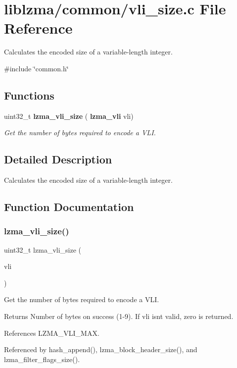 \section{liblzma/common/vli\+\_\+size.c File Reference}
\label{vli__size_8c}


Calculates the encoded size of a variable-\/length integer.  


{\ttfamily \#include \char`\"{}common.\+h\char`\"{}}\newline
\subsection*{Functions}
\begin{DoxyCompactItemize}
\item 
uint32\+\_\+t \textbf{ lzma\+\_\+vli\+\_\+size} (\textbf{ lzma\+\_\+vli} vli)
\begin{DoxyCompactList}\small\item\em Get the number of bytes required to encode a V\+LI. \end{DoxyCompactList}\end{DoxyCompactItemize}


\subsection{Detailed Description}
Calculates the encoded size of a variable-\/length integer. 



\subsection{Function Documentation}
\mbox{\label{vli__size_8c_a7818e4d09431b237a1d26ada34f15404}} 
\subsubsection{lzma\+\_\+vli\+\_\+size()}
{\footnotesize\ttfamily uint32\+\_\+t lzma\+\_\+vli\+\_\+size (\begin{DoxyParamCaption}\item[{\textbf{ lzma\+\_\+vli}}]{vli }\end{DoxyParamCaption})}



Get the number of bytes required to encode a V\+LI. 

\begin{DoxyReturn}{Returns}
Number of bytes on success (1-\/9). If vli isn\textquotesingle{}t valid, zero is returned. 
\end{DoxyReturn}


References L\+Z\+M\+A\+\_\+\+V\+L\+I\+\_\+\+M\+AX.



Referenced by hash\+\_\+append(), lzma\+\_\+block\+\_\+header\+\_\+size(), and lzma\+\_\+filter\+\_\+flags\+\_\+size().


